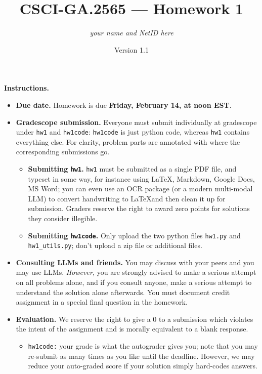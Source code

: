 \documentclass{article}
\title{CSCI-GA.2565 --- Homework 1}
\author{\emph{your name and NetID here}}
\date{Version 1.1}
\theoremstyle{definition}
\theoremstyle{remark}
\begin{document}
  \maketitle

  \noindent\textbf{Instructions.}
  \begin{itemize}
    \item
      \textbf{Due date.}
      Homework is due \textbf{Friday, February 14, at noon EST}.

    \item
      \textbf{Gradescope submission.}
      Everyone must submit individually at gradescope under \texttt{hw1} and \texttt{hw1code}:
      \texttt{hw1code} is just python code, whereas \texttt{hw1} contains everything else.
      For clarity, problem parts are annotated with where the corresponding submissions go.


      \begin{itemize}
        \item
          \textbf{Submitting \texttt{hw1}.}
          \texttt{hw1} must be submitted as a single PDF file, and typeset in some way,
          for instance using \LaTeX, Markdown, Google Docs, MS Word; you can even use an OCR
          package (or a modern multi-modal LLM) to convert handwriting to \LaTeX and then clean
          it up for submission.  Graders reserve the right to award zero points for
          solutions they consider illegible.

        \item
          \textbf{Submitting \texttt{hw1code}.}
          Only upload the two python files \texttt{hw1.py} and \texttt{hw1\_utils.py};
          don't upload a zip file or additional files.

      \end{itemize}

    \item
      \textbf{Consulting LLMs and friends.}
      You may discuss with your peers and you may use LLMs.  \emph{However,} you are strongly
      advised to make a serious attempt on all problems alone, and if you consult anyone,
      make a serious attempt to understand the solution alone afterwards.
      You must document credit assignment in a special final question in the homework.

    \item
      \textbf{Evaluation.}
      We reserve the right to give a 0 to a submission which violates the intent of the assignment
      and is morally equivalent to a blank response.
      \begin{itemize}
        \item
          \texttt{hw1code:} your grade is what the autograder gives you;
          note that you may re-submit as many times as you like until the deadline.
          However, we may reduce your auto-graded score if your solution simply hard-codes answers.


\end{itemize}
\end{itemize}
\end{document}
